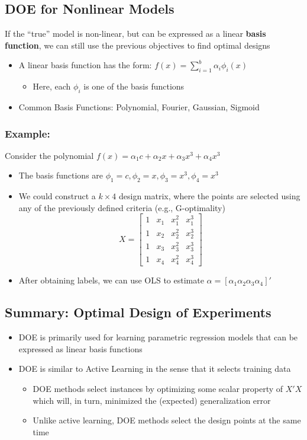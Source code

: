 \documentclass[10pt]{article}
\begin{document}
\subsection*{DOE for Nonlinear Models}
If the ``true'' model is non-linear, but can be expressed as a linear \textbf{basis function}, we can still use the previous objectives to find optimal designs
\begin{itemize}
	\item A linear basis function has the form: $f(x) = \sum_{i =1 }^b \alpha_i \phi_i(x)$
	\begin{itemize}
	    \item Here, each $\phi_i$ is one of the basis functions
    \end{itemize}
    \item Common Basis Functions: Polynomial, Fourier, Gaussian, Sigmoid
\end{itemize}

\subsubsection*{Example:}
Consider the polynomial $f(x) = \alpha_1 c + \alpha_2 x + \alpha_3 x^3 + \alpha_4 x^3$
\begin{itemize}
	\item The basis functions are $\phi_1 = c, \phi_2 = x, \phi_3 = x^3, \phi_4 = x^3$
	\item We could construct a $k \times 4$ design matrix, where the points are selected using any of the previously defined criteria (e.g., G-optimality)
	\[X =\begin{bmatrix} 1 & x_1 & x_1^2 & x_1^3 \\ 1 & x_2 & x_2^2 & x_2^3 \\ 1 & x_3 & x_3^2 & x_3^3 \\ 1 & x_4 & x_4^2 & x_4^3 \end{bmatrix}\]
    \item After obtaining labels, we can use OLS to estimate $\alpha = [\alpha_1 \alpha_2 \alpha_3 \alpha_4]'$
\end{itemize}

\subsection*{Summary: Optimal Design of Experiments}
\begin{itemize}
	\item DOE is primarily used for learning parametric regression models that can be expressed as linear basis functions
	\item DOE is similar to Active Learning in the sense that it selects training data
	\begin{itemize}
	    \item DOE methods select instances by optimizing some scalar property of $X'X$ which will, in turn, minimized the (expected) generalization error
	    \item Unlike active learning, DOE methods select the design points at the same time
    \end{itemize}
\end{itemize}
\end{document}
